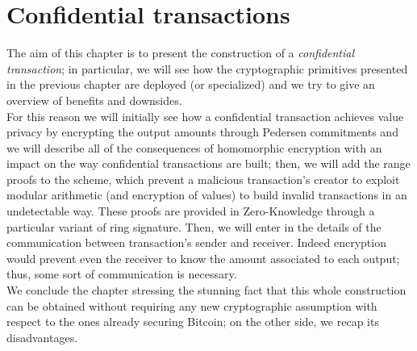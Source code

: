 \chapter{Confidential transactions}
\label{chpr:CTs}
The aim of this chapter is to present the construction of a \textit{confidential transaction}; in particular, we will see how the cryptographic primitives presented in the previous chapter are deployed (or specialized) and we try to give an overview of benefits and downsides.\\
For this reason we will initially see how a confidential transaction achieves value privacy by encrypting the output amounts through Pedersen commitments and we will describe all of the consequences of homomorphic encryption with an impact on the way confidential transactions are built; then, we will add the range proofs to the scheme, which prevent a malicious transaction's creator to exploit modular arithmetic (and encryption of values) to build invalid transactions in an undetectable way. These proofs are provided in Zero-Knowledge through a particular variant of ring signature. Then, we will enter in the details of the communication between transaction's sender and receiver. Indeed encryption would prevent even the receiver to know the amount associated to each output; thus, some sort of communication is necessary.\\
We conclude the chapter stressing the stunning fact that this whole construction can be obtained without requiring any new cryptographic assumption with respect to the ones already securing Bitcoin; on the other side, we recap its disadvantages.

